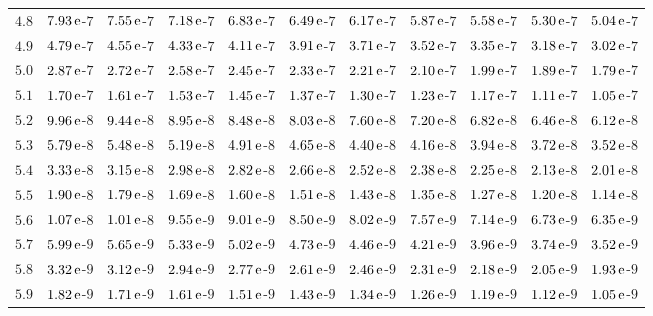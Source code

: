 \begin{table}[htb!]
\begin{center}
{\begin{tabular}{p{22 pt}cccccccccc}
$4.8$ & $7.93\,{\rm e}$-$7$ & $7.55\,{\rm e}$-$7$ & $7.18\,{\rm e}$-$7$ & $6.83\,{\rm e}$-$7$ & $6.49\,{\rm e}$-$7$ & $6.17\,{\rm e}$-$7$ & $5.87\,{\rm e}$-$7$ & $5.58\,{\rm e}$-$7$ & $5.30\,{\rm e}$-$7$ & $5.04\,{\rm e}$-$7$\\
$4.9$ & $4.79\,{\rm e}$-$7$ & $4.55\,{\rm e}$-$7$ & $4.33\,{\rm e}$-$7$ & $4.11\,{\rm e}$-$7$ & $3.91\,{\rm e}$-$7$ & $3.71\,{\rm e}$-$7$ & $3.52\,{\rm e}$-$7$ & $3.35\,{\rm e}$-$7$ & $3.18\,{\rm e}$-$7$ & $3.02\,{\rm e}$-$7$\\
$5.0$ & $2.87\,{\rm e}$-$7$ & $2.72\,{\rm e}$-$7$ & $2.58\,{\rm e}$-$7$ & $2.45\,{\rm e}$-$7$ & $2.33\,{\rm e}$-$7$ & $2.21\,{\rm e}$-$7$ & $2.10\,{\rm e}$-$7$ & $1.99\,{\rm e}$-$7$ & $1.89\,{\rm e}$-$7$ & $1.79\,{\rm e}$-$7$\\
$5.1$ & $1.70\,{\rm e}$-$7$ & $1.61\,{\rm e}$-$7$ & $1.53\,{\rm e}$-$7$ & $1.45\,{\rm e}$-$7$ & $1.37\,{\rm e}$-$7$ & $1.30\,{\rm e}$-$7$ & $1.23\,{\rm e}$-$7$ & $1.17\,{\rm e}$-$7$ & $1.11\,{\rm e}$-$7$ & $1.05\,{\rm e}$-$7$\\
$5.2$ & $9.96\,{\rm e}$-$8$ & $9.44\,{\rm e}$-$8$ & $8.95\,{\rm e}$-$8$ & $8.48\,{\rm e}$-$8$ & $8.03\,{\rm e}$-$8$ & $7.60\,{\rm e}$-$8$ & $7.20\,{\rm e}$-$8$ & $6.82\,{\rm e}$-$8$ & $6.46\,{\rm e}$-$8$ & $6.12\,{\rm e}$-$8$\\
$5.3$ & $5.79\,{\rm e}$-$8$ & $5.48\,{\rm e}$-$8$ & $5.19\,{\rm e}$-$8$ & $4.91\,{\rm e}$-$8$ & $4.65\,{\rm e}$-$8$ & $4.40\,{\rm e}$-$8$ & $4.16\,{\rm e}$-$8$ & $3.94\,{\rm e}$-$8$ & $3.72\,{\rm e}$-$8$ & $3.52\,{\rm e}$-$8$\\
$5.4$ & $3.33\,{\rm e}$-$8$ & $3.15\,{\rm e}$-$8$ & $2.98\,{\rm e}$-$8$ & $2.82\,{\rm e}$-$8$ & $2.66\,{\rm e}$-$8$ & $2.52\,{\rm e}$-$8$ & $2.38\,{\rm e}$-$8$ & $2.25\,{\rm e}$-$8$ & $2.13\,{\rm e}$-$8$ & $2.01\,{\rm e}$-$8$\\
$5.5$ & $1.90\,{\rm e}$-$8$ & $1.79\,{\rm e}$-$8$ & $1.69\,{\rm e}$-$8$ & $1.60\,{\rm e}$-$8$ & $1.51\,{\rm e}$-$8$ & $1.43\,{\rm e}$-$8$ & $1.35\,{\rm e}$-$8$ & $1.27\,{\rm e}$-$8$ & $1.20\,{\rm e}$-$8$ & $1.14\,{\rm e}$-$8$\\
$5.6$ & $1.07\,{\rm e}$-$8$ & $1.01\,{\rm e}$-$8$ & $9.55\,{\rm e}$-$9$ & $9.01\,{\rm e}$-$9$ & $8.50\,{\rm e}$-$9$ & $8.02\,{\rm e}$-$9$ & $7.57\,{\rm e}$-$9$ & $7.14\,{\rm e}$-$9$ & $6.73\,{\rm e}$-$9$ & $6.35\,{\rm e}$-$9$\\
$5.7$ & $5.99\,{\rm e}$-$9$ & $5.65\,{\rm e}$-$9$ & $5.33\,{\rm e}$-$9$ & $5.02\,{\rm e}$-$9$ & $4.73\,{\rm e}$-$9$ & $4.46\,{\rm e}$-$9$ & $4.21\,{\rm e}$-$9$ & $3.96\,{\rm e}$-$9$ & $3.74\,{\rm e}$-$9$ & $3.52\,{\rm e}$-$9$\\
$5.8$ & $3.32\,{\rm e}$-$9$ & $3.12\,{\rm e}$-$9$ & $2.94\,{\rm e}$-$9$ & $2.77\,{\rm e}$-$9$ & $2.61\,{\rm e}$-$9$ & $2.46\,{\rm e}$-$9$ & $2.31\,{\rm e}$-$9$ & $2.18\,{\rm e}$-$9$ & $2.05\,{\rm e}$-$9$ & $1.93\,{\rm e}$-$9$\\
$5.9$ & $1.82\,{\rm e}$-$9$ & $1.71\,{\rm e}$-$9$ & $1.61\,{\rm e}$-$9$ & $1.51\,{\rm e}$-$9$ & $1.43\,{\rm e}$-$9$ & $1.34\,{\rm e}$-$9$ & $1.26\,{\rm e}$-$9$ & $1.19\,{\rm e}$-$9$ & $1.12\,{\rm e}$-$9$ & $1.05\,{\rm e}$-$9$\\
\hline


\end{tabular}}
\end{center}
\end{table}
